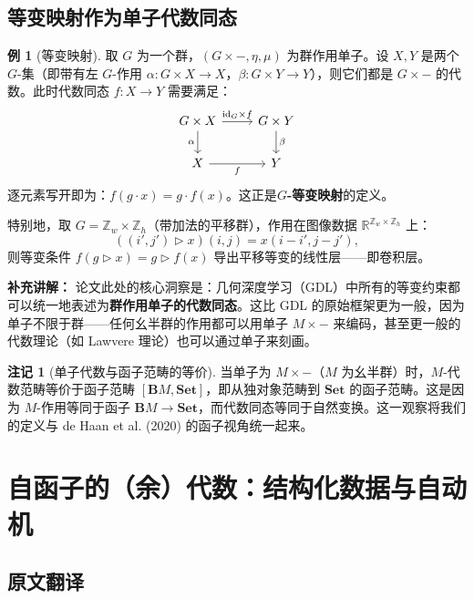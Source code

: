 \documentclass[12pt,a4paper]{ctexart}
\theoremstyle{definition}
\newtheorem{example}[definition]{例}
\newtheorem{remark}[definition]{注记}
\newcommand{\cat}[1]{\mathbf{#1}}
\newcommand{\Set}{\cat{Set}}
\newcommand{\id}{\mathrm{id}}
\begin{document}
\subsection{等变映射作为单子代数同态}

\begin{example}[等变映射]\label{ex:equivariant}
取 $G$ 为一个群，$(G\times-,\eta,\mu)$ 为群作用单子。设 $X,Y$ 是两个 $G$-集（即带有左 $G$-作用 $\alpha:G\times X\to X$，$\beta:G\times Y\to Y$），则它们都是 $G\times-$ 的代数。此时代数同态 $f:X\to Y$ 需要满足：
\[
\begin{tikzcd}
G\times X \arrow[r,"\id_G\times f"] \arrow[d,"\alpha"'] & G\times Y \arrow[d,"\beta"] \\
X \arrow[r,"f"'] & Y
\end{tikzcd}
\]
逐元素写开即为：$f(g\cdot x)=g\cdot f(x)$。这正是\textbf{$G$-等变映射}的定义。

特别地，取 $G=\mathbb Z_w\times\mathbb Z_h$（带加法的平移群），作用在图像数据 $\mathbb R^{\mathbb Z_w\times\mathbb Z_h}$ 上：
\[((i',j')\rhd x)(i,j)=x(i-i',j-j'),\]
则等变条件 $f(g\rhd x)=g\rhd f(x)$ 导出平移等变的线性层——即卷积层。
\end{example}

\textbf{补充讲解：} 论文此处的核心洞察是：几何深度学习（GDL）中所有的等变约束都可以统一地表述为\textbf{群作用单子的代数同态}。这比 GDL 的原始框架更为一般，因为单子不限于群——任何幺半群的作用都可以用单子 $M\times-$ 来编码，甚至更一般的代数理论（如 Lawvere 理论）也可以通过单子来刻画。

\begin{remark}[单子代数与函子范畴的等价]\label{rem:monad-functor}
当单子为 $M\times-$（$M$ 为幺半群）时，$M$-代数范畴等价于函子范畴 $[\mathbf{B}M,\Set]$，即从独对象范畴到 $\Set$ 的函子范畴。这是因为 $M$-作用等同于函子 $\mathbf{B}M\to\Set$，而代数同态等同于自然变换。这一观察将我们的定义与 de Haan et al. (2020) 的函子视角统一起来。
\end{remark}

\newpage

\section{自函子的（余）代数：结构化数据与自动机}

\subsection{原文翻译}
\end{document}
